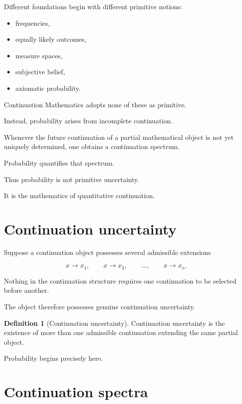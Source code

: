 \documentclass[13pt,openany]{book}
\theoremstyle{plain}
\theoremstyle{definition}
\newtheorem{definition}{Definition}[chapter]
\begin{document}
Different foundations begin with different primitive notions:

\begin{itemize}
    \item frequencies,
    \item equally likely outcomes,
    \item measure spaces,
    \item subjective belief,
    \item axiomatic probability.
\end{itemize}

Continuation Mathematics adopts none of these as primitive.

Instead, probability arises from incomplete continuation.

Whenever the future continuation of a partial mathematical object is not yet
uniquely determined, one obtains a continuation spectrum.

Probability quantifies that spectrum.

Thus probability is not primitive uncertainty.

It is the mathematics of quantitative continuation.

\section{Continuation uncertainty}

Suppose a continuation object possesses several admissible extensions

\[
x
\longrightarrow
x_1,
\qquad
x
\longrightarrow
x_2,
\qquad
\ldots,
\qquad
x
\longrightarrow
x_n.
\]

Nothing in the continuation structure requires one continuation to be selected
before another.

The object therefore possesses genuine continuation uncertainty.

\begin{definition}[Continuation uncertainty]
Continuation uncertainty is the existence of more than one admissible
continuation extending the same partial object.
\end{definition}

Probability begins precisely here.

\section{Continuation spectra}
\end{document}
